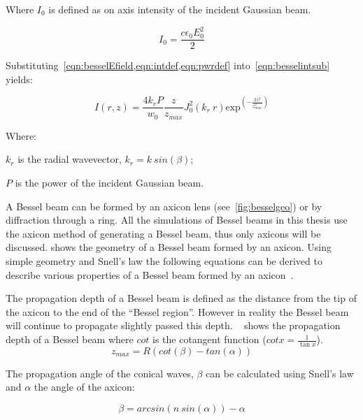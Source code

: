 Where $I_0$ is defined as on axis intensity of the incident Gaussian beam.

\begin{equation}
    I_0=\frac{c\epsilon_0E_0^2}{2}
    \label{eqn:intdef}
\end{equation}

Substituting~\cref{eqn:besselEfield,eqn:intdef,eqn:pwrdef} into~\cref{eqn:besselintsub} yields:

\begin{equation}
    I(r,z)=\frac{4k_rP}{w_0}\frac{z}{z_{max}}J_0^2\left(k_r\ r\right)\text{exp}^{\left(-\frac{2z^2}{z^2_{max}}\right)}
    \label{eqn:besselInt}
\end{equation}


\noindent Where:

    \indent $k_r$ is the radial wavevector, $k_r=k\ sin(\beta)$;

    \indent $P$ is the power of the incident Gaussian beam.

    \medskip

A Bessel beam can be formed by an axicon lens (see~\cref{fig:besselgeo}) or by diffraction through a ring.
All the simulations of Bessel beams in this thesis use the axicon method of generating a Bessel beam, thus only axicons will be discussed.
 shows the geometry of a Bessel beam formed by an axicon.
Using simple geometry and Snell's law the following equations can be derived to describe various properties of a Bessel beam formed by an axicon~\cite{merola2012characterization}.

The propagation depth of a Bessel beam is defined as the distance from the tip of the axicon to the end of the ``Bessel region''. However in reality the Bessel beam will continue to propagate slightly passed this depth.
~ shows the propagation depth of a Bessel beam where $cot$ is the cotangent function ($cot x = \tfrac{1}{\tan x}$).
\begin{equation}
z_{max}=R\left(cot\left(\beta\right) - tan\left(\alpha\right)\right)
\label{eqn:besselzmax}
\end{equation}

The propagation angle of the conical waves, $\beta$ can be calculated using Snell's law and $\alpha$ the angle of the axicon:

\begin{equation}
\beta = arcsin\left(n\ sin\left(\alpha\right)\right)-\alpha
\label{eqn:betaangle}
\end{equation}

